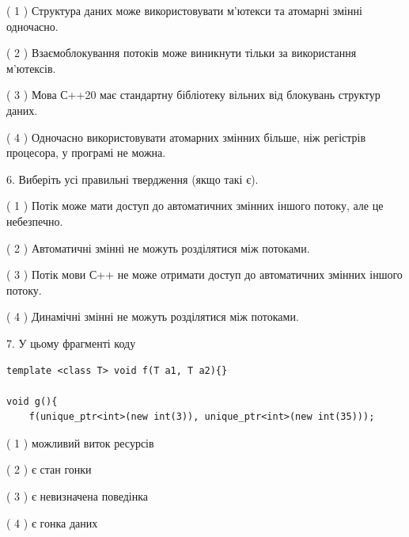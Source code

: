 \documentclass[12pt, ukrainian]{article}
\begin{document}
\begin {large}
{( 1 ) Структура даних може використовувати м’ютекси та атомарні змінні одночасно.%

( 2 ) Взаємоблокування потоків може виникнути тільки за використання м’ютексів.%

( 3 ) Мова С++20 має стандартну бібліотеку вільних від блокувань структур даних.%

( 4 ) Одночасно використовувати атомарних змінних більше, ніж регістрів процесора, у програмі не можна.%
\newpage



\vspace{5mm}
6. Виберіть усі правильні твердження (якщо такі є).\par
\vspace{2mm}

( 1 ) Потік може мати доступ до автоматичних змінних іншого потоку, але це небезпечно.%

( 2 ) Автоматичні змінні не можуть розділятися між потоками.%

( 3 ) Потік мови С++ не може отримати доступ до автоматичних змінних іншого потоку.%

( 4 ) Динамічні змінні не можуть розділятися між потоками.%


\vspace{5mm}
7. У цьому фрагменті коду
\begin{verbatim}
template <class T> void f(T a1, T a2){}

void g(){
    f(unique_ptr<int>(new int(3)), unique_ptr<int>(new int(35)));
\end{verbatim}

( 1 ) можливий виток ресурсів%

( 2 ) є стан гонки%

( 3 ) є невизначена поведінка%

( 4 ) є гонка даних%
}
\end {large}
\end{document}
